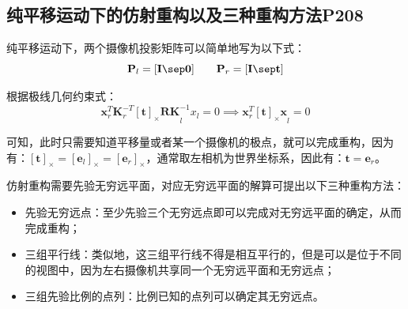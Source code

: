 \documentclass[11pt]{article}
\begin{document}
\subsection{纯平移运动下的仿射重构以及三种重构方法P208}
纯平移运动下，两个摄像机投影矩阵可以简单地写为以下式：
\begin{equation*}
  \mathbf{P}_l=
    [\mathbf{I\sep 0}]
\qquad\mathbf{P}_r=[\mathbf{I\sep t}]
\end{equation*}\par
根据极线几何约束式：
\begin{equation*}
  \mathbf{x}_r^T\mathbf{K}_r^{-T}\mathbf{[t]_\times RK}_l^{-1}x_l=0\implies\mathbf{x}_r^T\mathbf{[t]_\times x}_l=0
\end{equation*}\par
可知，此时只需要知道平移量或者某一个摄像机的极点，就可以完成重构，因为有：$\mathbf{[t]_\times=[e_\mathit{l}]_\times=[e_\mathit{r}]_\times}$，通常取左相机为世界坐标系，因此有：$\mathbf{t=e}_{r}$。\par
仿射重构需要先验无穷远平面，对应无穷远平面的解算可提出以下三种重构方法：
\begin{itemize}
  \item 先验无穷远点：至少先验三个无穷远点即可以完成对无穷远平面的确定，从而完成重构；
  \item 三组平行线：类似地，这三组平行线不得是相互平行的，但是可以是位于不同的视图中，因为左右摄像机共享同一个无穷远平面和无穷远点；
  \item 三组先验比例的点列：比例已知的点列可以确定其无穷远点。
\end{itemize}
\end{document}
